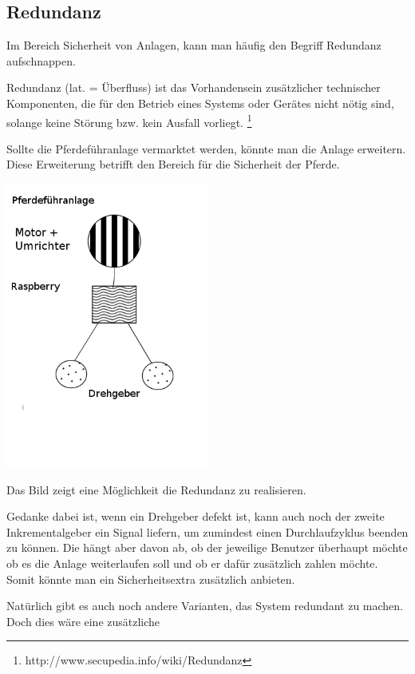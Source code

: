 \documentclass[12pt]{scrreprt} %
\begin{document}
\subsection{Redundanz}
\label{sec:redundanz}

Im Bereich Sicherheit von Anlagen, kann man häufig den Begriff Redundanz aufschnappen. 

 Redundanz (lat. = Überfluss) ist das Vorhandensein zusätzlicher technischer Komponenten, die für den Betrieb eines Systems oder Gerätes nicht nötig sind, solange keine Störung bzw. kein Ausfall vorliegt. \footnote{http://www.secupedia.info/wiki/Redundanz}

Sollte die Pferdeführanlage vermarktet werden, könnte man die Anlage erweitern. Diese Erweiterung betrifft den Bereich für die Sicherheit der Pferde.

\begin{center}
	\includegraphics[width=0.5\textwidth]{Redundanz}
\end{center}

Das Bild zeigt eine Möglichkeit die Redundanz zu realisieren.

Gedanke dabei ist, wenn ein Drehgeber defekt ist, kann auch noch der zweite Inkrementalgeber ein Signal liefern, um zumindest einen Durchlaufzyklus beenden zu können. Die hängt aber davon ab, ob der jeweilige Benutzer überhaupt möchte ob es die Anlage weiterlaufen soll und ob er dafür zusätzlich zahlen möchte. Somit könnte man ein Sicherheitsextra zusätzlich anbieten.

Natürlich gibt es auch noch andere Varianten, das System redundant zu machen. Doch dies wäre eine zusätzliche 
\end{document}
